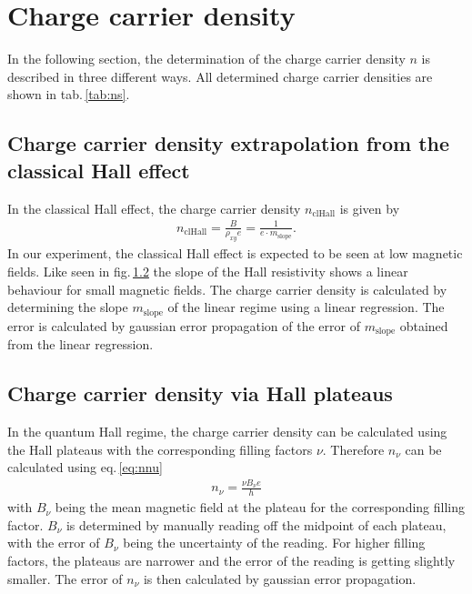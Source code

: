 \section{Charge carrier density}
In the following section, the determination of the charge carrier density $n$ is described in three different ways.
All determined charge carrier densities are shown in tab.\,\ref{tab:ns}.
\subsection{Charge carrier density extrapolation from the classical Hall effect}
In the classical Hall effect, the charge carrier density $n_\text{clHall}$ is given by 
\begin{align}
    n_\text{clHall} = \frac{B}{\rho_{xy}e} = \frac{1}{e \cdot m_\text{slope}}.
    \label{eq:chargeCarrierClassicalHall}
\end{align}
In our experiment, the classical Hall effect is expected to be seen at low magnetic fields.
Like seen in fig.\,\ref{} the slope of the Hall resistivity shows a linear behaviour for small magnetic fields.
The charge carrier density is calculated by determining the slope $m_\text{slope}$ of the linear regime using a linear regression.
The error is calculated by gaussian error propagation of the error of $m_\text{slope}$ obtained from the linear regression.

\subsection{Charge carrier density via Hall plateaus}
In the quantum Hall regime, the charge carrier density can be calculated using the Hall plateaus with the corresponding filling factors $\nu$.
Therefore $n_\nu$ can be calculated using eq.\,\ref{eq:nnu}
\begin{align}
    n_\nu = \frac{\nu B_\nu e}{h}
\end{align}
with $B_\nu$ being the mean magnetic field at the plateau for the corresponding filling factor.
$B_\nu$ is determined by manually reading off the midpoint of each plateau, with the error of $B_\nu$ being
the uncertainty of the reading. For higher filling factors, the plateaus are narrower and the error of the reading is getting slightly smaller.
The error of $n_\nu$ is then calculated by gaussian error propagation.

